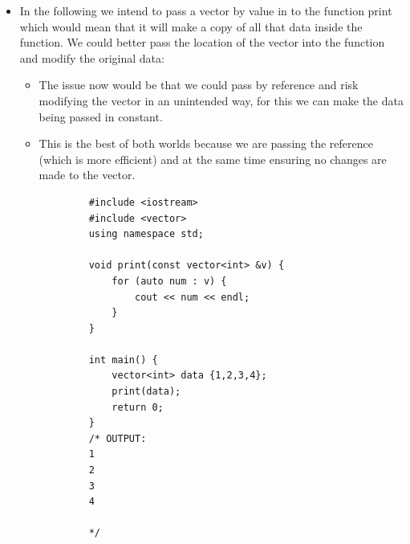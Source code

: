 \begin{itemize}
\begin{verbatim}
            */
        \end{verbatim}
    
    \item In the following we intend to pass a vector by value in to the function print which would mean that it will make a copy of all that data inside the function. We could better pass the location of the vector into the function and modify the original data:
        \begin{itemize}
            \item The issue now would be that we could pass by reference and risk modifying the vector in an unintended way, for this we can make the data being passed in constant.
            \item This is the best of both worlds because we are passing the reference (which is more efficient) and at the same time ensuring no changes are made to the vector.
        \end{itemize}
        \begin{verbatim}
            #include <iostream>
            #include <vector>
            using namespace std;

            void print(const vector<int> &v) {
                for (auto num : v) {
                    cout << num << endl;
                }
            }

            int main() {
                vector<int> data {1,2,3,4};
                print(data);
                return 0;
            }
            /* OUTPUT:
            1
            2
            3
            4

            */
        \end{verbatim}
\end{itemize}


